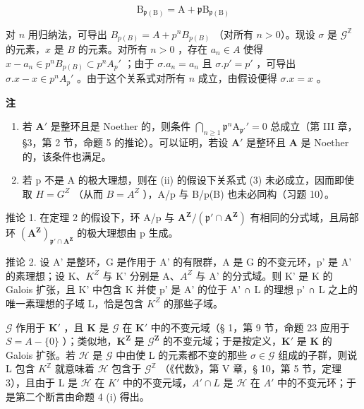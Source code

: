 \[
\mathrm{B} _ {\mathfrak {p} (\mathrm{B})} = \mathrm{A} + \mathfrak {p} \mathrm{B} _ {\mathfrak {p} (\mathrm{B})}\tag{5}
\]

对 \(n\) 用归纳法，可导出 \(B_{p(B)} = A + p^n B_{p(B)}\) （对所有 \(n > 0\)）。现设 \(\sigma\) 是 \(\mathcal{G}^{\mathbb{Z}}\) 的元素，\(x\) 是 \(B\) 的元素。对所有 \(n > 0\) ，存在 \(a_n \in A\) 使得 \(x - a_n \in p^n B_{p(B)} \subset p^n A_p'\) ；由于 \(\sigma .a_n = a_n\) 且 \(\sigma .p' = p'\) ，可导出 \(\sigma .x - x \in p^n A_p'\) 。由于这个关系式对所有 \(n\) 成立，由假设便得 \(\sigma .x = x\) 。

\textbf{注}\par

\begin{enumerate}
\def\labelenumi{(\arabic{enumi})}
\setcounter{enumi}{2}
\item
  若 \(\mathbf{A}'\) 是整环且是 Noether 的，则条件 \(\bigcap_{n\geqslant 1}\mathfrak{p}^n\mathrm{A}_{\mathfrak{p}'}' = 0\) 总成立（第 III 章，§3，第 2 节，命题 5 的推论）。可以证明，若设 \(\mathbf{A}'\) 是整环且 \(\mathbf{A}\) 是 Noether 的，该条件也满足。
\item
  若 p 不是 A 的极大理想，则在 (ii) 的假设下关系式 (3) 未必成立，因而即使取 \(H = G^{Z}\) （从而 \(B = A^{Z}\) ），A/p 与 B/p(B) 也未必同构（习题 10）。
\end{enumerate}

推论 1. 在定理 2 的假设下，环 A/p 与 \(\mathbf{A}^{\mathbf{Z}} / (\mathfrak{p}'\cap \mathbf{A}^{\mathbf{Z}})\) 有相同的分式域，且局部环 \((\mathbf{A}^{\mathbf{Z}})_{\mathfrak{p}'\cap \mathbf{A}^{\mathbf{Z}}}\) 的极大理想由 p 生成。

推论 2. 设 A' 是整环，G 是作用于 A' 的有限群，A 是 G 的不变元环，p' 是 A' 的素理想；设 K、\(K^{Z}\) 与 K' 分别是 A、\(A^{Z}\) 与 A' 的分式域。则 K' 是 K 的 Galois 扩张，且 K' 中包含 K 并使 p' 是 A' 的位于 A' ∩ L 的理想 p' ∩ L 之上的唯一素理想的子域 L，恰是包含 \(K^{Z}\) 的那些子域。

\(\mathcal{G}\) 作用于 \(\mathbf{K}'\) ，且 \(\mathbf{K}\) 是 \(\mathcal{G}\) 在 \(\mathbf{K}'\) 中的不变元域（§ 1，第 9 节，命题 23 应用于 \(S = A - \{0\}\) ）；类似地，\(\mathbf{K}^{\mathbf{Z}}\) 是 \(\mathcal{G}^{\mathbf{Z}}\) 的不变元域；于是按定义，\(\mathbf{K}'\) 是 \(\mathbf{K}\) 的 Galois 扩张。若 \(\mathcal{H}\) 是 \(\mathcal{G}\) 中由使 L 的元素都不变的那些 \(\sigma \in \mathcal{G}\) 组成的子群，则说 L 包含 \(K^{\mathbb{Z}}\) 就意味着 \(\mathcal{H}\) 包含于 \(\mathcal{G}^{\mathbb{Z}}\) （《代数》，第 V 章，§ 10，第 5 节，定理 3），且由于 L 是 \(\mathcal{H}\) 在 \(K'\) 中的不变元域，\(A' \cap L\) 是 \(\mathcal{H}\) 在 \(A'\) 中的不变元环；于是第二个断言由命题 4 (i) 得出。


